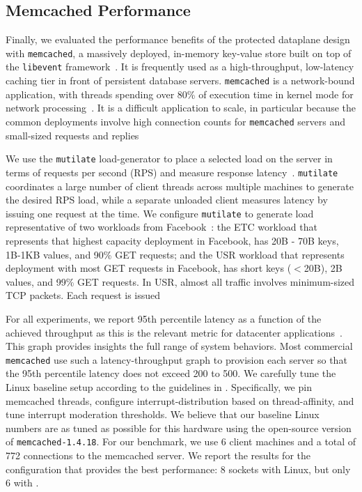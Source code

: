 
\subsection{Memcached Performance}
\label{sec:eval:memcached}




Finally, we evaluated the performance benefits of the \ix protected
dataplane design with \texttt{memcached}, a massively deployed,
in-memory key-value store built on top of the \texttt{libevent}
framework~\cite{url:memcached}. It is frequently used as a
high-throughput, low-latency caching tier in front of persistent
database servers. \texttt{memcached} is a network-bound
application, with threads spending over 80\% of execution time in
kernel mode for network processing~\cite{Leverich:RHSU:2014}. It is a
difficult application to scale, in particular because the
common deployments involve high connection counts for
\texttt{memcached} servers and small-sized requests and
replies~\cite{nishtala2013scaling,Atikoglu:2012:WAL}

We use the \texttt{mutilate} load-generator to place a selected load
on the server in terms of requests per second (RPS) and measure
response latency~\cite{url:mutilate}. \texttt{mutilate} coordinates a
large number of client threads across multiple machines to generate
the desired RPS load, while a separate unloaded client measures
latency by issuing one request at the time.  We configure
\texttt{mutilate} to generate load representative of two workloads
from Facebook~\cite{Atikoglu:2012:WAL}: the ETC workload that
represents that highest capacity deployment in Facebook, has 20B - 70B
keys, 1B-1KB values, and 90\% GET requests; and the USR workload that
represents deployment with most GET requests in Facebook, has short
keys ($<$20B), 2B values, and 99\% GET requests. In USR, almost all
traffic involves minimum-sized TCP packets. Each request is issued 

For all experiments, we report 95th percentile latency as a function
of the achieved throughput as this is the relevant metric for
datacenter
applications\microsecond~\cite{DBLP:journals/cacm/DeanB13}. This graph
provides insights the full range of system behaviors. Most commercial
\texttt{memcached} use such a latency-throughput graph to provision
each server so that the 95th percentile latency does not exceed 200 to
500.  We carefully tune the Linux baseline setup according to the
guidelines in \cite{Leverich:RHSU:2014}. Specifically, we pin
memcached threads, configure interrupt-distribution based on
thread-affinity, and tune interrupt moderation thresholds. We believe
that our baseline Linux numbers are as tuned as possible for this
hardware using the open-source version of
\texttt{memcached-1.4.18}. For our benchmark, we use 6 client machines
and a total of 772 connections to the memcached server. We report the
results for the configuration that provides the best performance: 
8 sockets with Linux, but only 6 with \ix.

